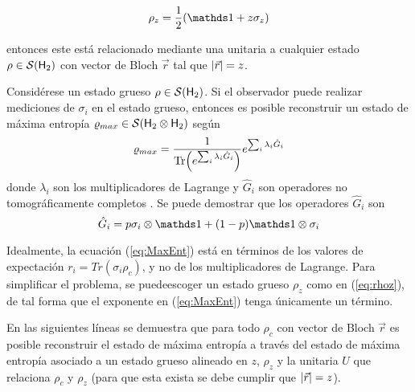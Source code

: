 \begin{equation}\label{eq:rhoz}
\rho_{z}=\frac{1}{2}\qty(\Id+z\sigma_{z})
\end{equation}

entonces este está relacionado mediante una unitaria a cualquier estado $\rho\in\mathcal{S}({\sf H}_2)$ con vector de Bloch $\vec{r}$ tal que $\abs{\vec{r}}=z$.

Considérese un estado grueso $\rho\in\mathcal{S}({\sf H}_2)$. Si el observador puede realizar mediciones de $\sigma_{i}$ en el estado grueso, entonces es posible reconstruir un estado de máxima entropía $\varrho_{max}\in\mathcal{S}({\sf H}_2 \otimes {\sf H}_2)$ según
\begin{equation}\label{eq:MaxEnt}
\varrho_{max}=\frac{1}{\Tr(e^{\sum_{i}\lambda_{i}\hat{G}_{i}})}e^{\sum_{i}\lambda_{i}\hat{G}_{i}}
\end{equation}
donde $\lambda_{i}$ son los multiplicadores de Lagrange y $\hat{G}_{i}$ son operadores no tomográficamente completos \cite{MaxEnt}. Se puede demostrar que los operadores $\hat{G}_{i}$ son
\begin{equation}\label{eq:Gop}
\hat{G}_{i}=p\sigma_{i}\otimes\Id+(1-p)\Id\otimes\sigma_{i}
\end{equation}

Idealmente, la ecuación (\ref{eq:MaxEnt}) está en términos de los valores de expectación $r_{i}=Tr(\sigma_{i}\rho_{c})$, y no de los multiplicadores de Lagrange. Para simplificar el problema, se puedeescoger un estado grueso $\rho_{z}$ como en (\ref{eq:rhoz}), de tal forma que el exponente en (\ref{eq:MaxEnt}) tenga únicamente un término.

\vspace{0.2cm}

En las siguientes líneas se demuestra que para todo $\rho_{c}$ con vector de Bloch $\vec{r}$ es posible reconstruir el estado de máxima entropía a través del estado de máxima entropía asociado a un estado grueso alineado en $z$, $\rho_{z}$ y la unitaria $U$ que relaciona $\rho_{c}$ y $\rho_{z}$ (para que esta exista se debe cumplir que $\abs{\vec{r}}=z$).

\vspace{0.2cm}

